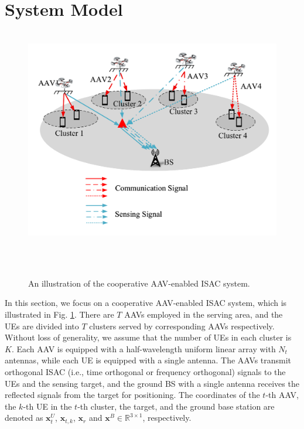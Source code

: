 \documentclass[twocolumn,journal]{IEEEtran}
\begin{document}
\section{System Model}
\begin{figure}[t]
    \centering
    \includegraphics[width = 0.7\linewidth]{figure/systemmodel.pdf}
    \caption{An illustration of the cooperative AAV-enabled ISAC system.}
    \label{fig:systemModel}
\end{figure}
In this section, we focus on a cooperative AAV-enabled ISAC system, which is illustrated in Fig. \ref{fig:systemModel}. There are \(T\) AAVs employed in the serving area, and the UEs are divided into \(T\) clusters served by corresponding AAVs respectively. Without loss of generality, we assume that the number of UEs in each cluster is \(K\). Each AAV is equipped with a half-wavelength uniform linear array with \(N_t\) antennas, while each UE is equipped with a single antenna. The AAVs transmit orthogonal ISAC (i.e., time orthogonal or frequency orthogonal) signals to the UEs and the sensing target, and the ground BS with a single antenna receives the reflected signals from the target for positioning. The coordinates of the \(t\)-th AAV, the \(k\)-th UE in the \(t\)-th cluster, the target, and the ground base station are denoted as \(\boldsymbol{x}^{U}_{t}\), \(\boldsymbol{x}_{t,k}\), \(\boldsymbol{x}_{r}\) and \(\boldsymbol{x}^{B}\in \mathbb{R}^{3\times 1}\), respectively.
\end{document}
